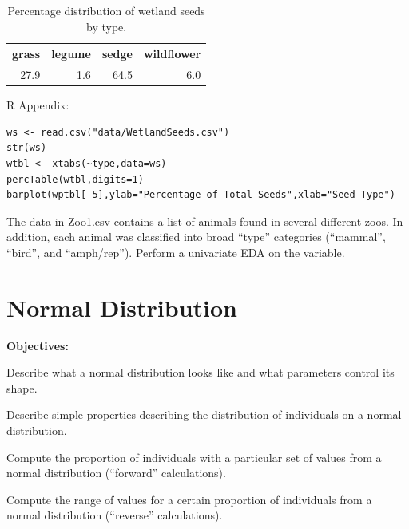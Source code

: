\documentclass[10pt,openany]{book}\usepackage[]{graphicx}\usepackage[]{color}
\makeatletter
\newenvironment{kframe}{%
 \def\at@end@of@kframe{}%
 \ifinner\ifhmode%
  \def\at@end@of@kframe{\end{minipage}}%
  \begin{minipage}{\columnwidth}%
 \fi\fi%
 \def\FrameCommand##1{\hskip\@totalleftmargin \hskip-\fboxsep
 \colorbox{shadecolor}{##1}\hskip-\fboxsep
     \hskip-\linewidth \hskip-\@totalleftmargin \hskip\columnwidth}%
 \MakeFramed {\advance\hsize-\width
   \@totalleftmargin\z@ \linewidth\hsize
   \@setminipage}}%
 {\par\unskip\endMakeFramed%
 \at@end@of@kframe}
\newenvironment{knitrout}{}{} %
\makeatother
\begin{document}
\begin{table}[ht]
\centering
\caption{Percentage distribution of wetland seeds by type.} 
\label{tab:SeedTable}
\begin{tabular}{rrrr}
  \hline
grass & legume & sedge & wildflower \\ 
  \hline
27.9 & 1.6 & 64.5 & 6.0 \\ 
   \hline
\end{tabular}
\end{table}


\begin{minipage}{\textwidth}
R Appendix:
\begin{knitrout}
\color{fgcolor}\begin{kframe}
\begin{verbatim}
ws <- read.csv("data/WetlandSeeds.csv")
str(ws)
wtbl <- xtabs(~type,data=ws)
percTable(wtbl,digits=1)
barplot(wptbl[-5],ylab="Percentage of Total Seeds",xlab="Seed Type")
\end{verbatim}
\end{kframe}
\end{knitrout}
\end{minipage}

\begin{exsection}
  \item \label{revex:cuEDAZoo1} \rhw{} The data in \href{https://raw.githubusercontent.com/droglenc/NCData/master/Zoo1.csv}{Zoo1.csv} contains a list of animals found in several different zoos.  In addition, each animal was classified into broad ``type'' categories (``mammal'', ``bird'', and ``amph/rep'').  Perform a univariate EDA on the  variable. 
\end{exsection}



\chapter{Normal Distribution}  \label{chap:NormDist}
\begin{ChapObj}{\boxwidth}
  \textbf{Objectives:}
  \begin{Enumerate}
    \item Describe what a normal distribution looks like and what parameters control its shape.
    \item Describe simple properties describing the distribution of individuals on a normal distribution.
    \item Compute the proportion of individuals with a particular set of values from a normal distribution (``forward'' calculations).
    \item Compute the range of values for a certain proportion of individuals from a normal distribution (``reverse'' calculations).
  \end{Enumerate}
\end{ChapObj}
\end{document}
